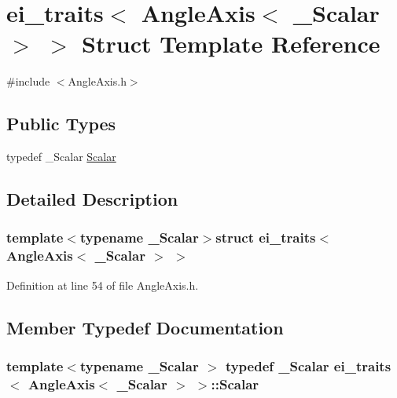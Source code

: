 \hypertarget{structei__traits_3_01_angle_axis_3_01___scalar_01_4_01_4}{\section{ei\-\_\-traits$<$ Angle\-Axis$<$ \-\_\-\-Scalar $>$ $>$ Struct Template Reference}
\label{structei__traits_3_01_angle_axis_3_01___scalar_01_4_01_4}
}


{\ttfamily \#include $<$Angle\-Axis.\-h$>$}

\subsection*{Public Types}
\begin{DoxyCompactItemize}
\item 
typedef \-\_\-\-Scalar \hyperlink{structei__traits_3_01_angle_axis_3_01___scalar_01_4_01_4_aed42d73310c3552efafd38d6c7e80fe7}{Scalar}
\end{DoxyCompactItemize}


\subsection{Detailed Description}
\subsubsection*{template$<$typename \-\_\-\-Scalar$>$struct ei\-\_\-traits$<$ Angle\-Axis$<$ \-\_\-\-Scalar $>$ $>$}



Definition at line 54 of file Angle\-Axis.\-h.



\subsection{Member Typedef Documentation}
\hypertarget{structei__traits_3_01_angle_axis_3_01___scalar_01_4_01_4_aed42d73310c3552efafd38d6c7e80fe7}{
\subsubsection[{Scalar}]{\setlength{\rightskip}{0pt plus 5cm}template$<$typename \-\_\-\-Scalar $>$ typedef \-\_\-\-Scalar {\bf ei\-\_\-traits}$<$ {\bf Angle\-Axis}$<$ \-\_\-\-Scalar $>$ $>$\-::{\bf Scalar}}}\label{structei__traits_3_01_angle_axis_3_01___scalar_01_4_01_4_aed42d73310c3552efafd38d6c7e80fe7}


